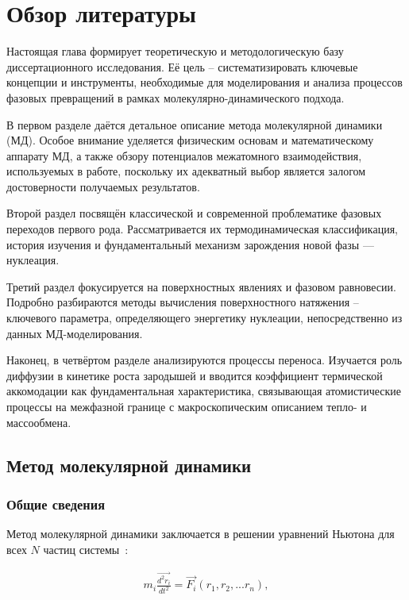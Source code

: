 \chapter{Обзор литературы}\label{ch:ch1}

Настоящая глава формирует теоретическую и методологическую базу диссертационного исследования. Её цель \--- систематизировать ключевые концепции и инструменты, необходимые для моделирования и анализа процессов фазовых превращений в рамках молекулярно-динамического подхода. 

В первом разделе даётся детальное описание метода молекулярной динамики (МД). Особое внимание уделяется физическим основам и математическому аппарату МД, а также обзору потенциалов межатомного взаимодействия, используемых в работе, поскольку их адекватный выбор является залогом достоверности получаемых результатов.

Второй раздел посвящён классической и современной проблематике фазовых переходов первого рода. Рассматривается их термодинамическая классификация, история изучения и фундаментальный механизм зарождения новой фазы — нуклеация.

Третий раздел фокусируется на поверхностных явлениях и фазовом равновесии. Подробно разбираются методы вычисления поверхностного натяжения \--- ключевого параметра, определяющего энергетику нуклеации, непосредственно из данных МД-моделирования.

Наконец, в четвёртом разделе анализируются процессы переноса. Изучается роль диффузии в кинетике роста зародышей и вводится коэффициент термической аккомодации как фундаментальная характеристика, связывающая атомистические процессы на межфазной границе с макроскопическим описанием тепло- и массообмена. 


\section{Метод молекулярной динамики}

\subsection{Общие сведения}

Метод молекулярной динамики заключается в решении уравнений Ньютона для всех $N$ частиц системы~\cite{frenkel_understanding_2001}:

\begin{align}
	m_i\frac{\overrightarrow{d^2r_i}}{dt^2} = \overrightarrow{F_i}(r_1, r_2, ... r_n),
\end{align}


